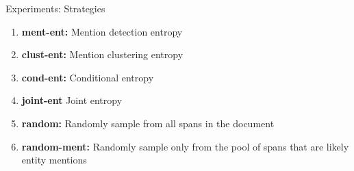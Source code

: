 



\begin{frame}{Experiments: Strategies}
\begin{enumerate}
\item \textbf{ment-ent:} Mention detection entropy
\item \textbf{clust-ent:} Mention clustering entropy
\item \textbf{cond-ent:} Conditional entropy
\item \textbf{joint-ent} Joint entropy
\item \textbf{random:} Randomly sample from all spans in the document
\item \textbf{random-ment:} Randomly sample only from
    the pool of spans that are likely entity mentions
\end{enumerate}
\end{frame}

